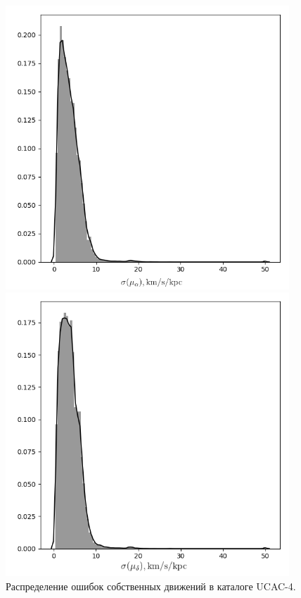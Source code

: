 \documentclass{matmex-diploma-custom}
\begin{document}
\begin{figure}[h!]
\caption{Распределение ошибок собственных движений в каталоге UCAC-4.}
\begin{minipage}[h]{0.49\linewidth}
        \includegraphics[width=0.95\textwidth]{../imgs/pm_ra_err_distr.png}
\end{minipage}
\hfill
\begin{minipage}[h]{0.49\linewidth}
        \includegraphics[width=0.95\textwidth]{../imgs/pm_dec_err_distr.png}
\end{minipage}
\end{figure}
\end{document}
